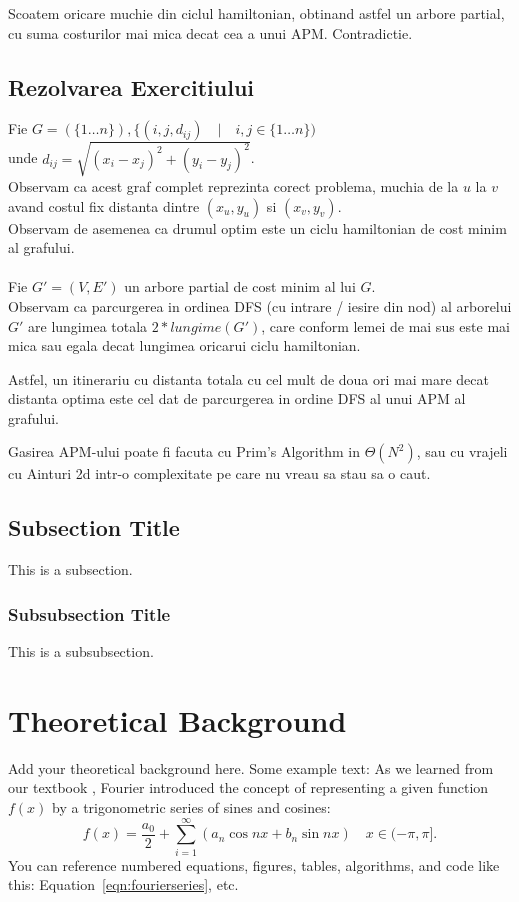\documentclass{article}
\begin{document}
Scoatem oricare muchie din ciclul hamiltonian, obtinand astfel un arbore partial, cu suma costurilor mai mica decat cea a unui APM. Contradictie.

\subsection*{Rezolvarea Exercitiului}

Fie $G = (\{1 \dots n\}), \{(i, j, d_{ij}) \quad | \quad i, j \in \{1 \dots n\})$\\
unde $d_{ij} = \sqrt{(x_i-x_j)^2+(y_i-y_j)^2}$.\\
Observam ca acest graf complet reprezinta corect problema, muchia de la $u$ la $v$ avand costul fix distanta dintre $(x_u, y_u)$ si $(x_v, y_v)$.\\
Observam de asemenea ca drumul optim este un ciclu hamiltonian de cost minim al grafului.\\

\\
Fie $G' = (V, E')$ un arbore partial de cost minim al lui $G$.\\
Observam ca parcurgerea in ordinea DFS (cu intrare / iesire din nod) al arborelui $G'$ are lungimea totala $2 * lungime(G')$, care conform lemei de mai sus este mai mica sau egala decat lungimea oricarui ciclu hamiltonian.

Astfel, un itinerariu cu distanta totala cu cel mult de doua ori mai mare decat distanta optima este cel dat de parcurgerea in ordine DFS al unui APM al grafului.

Gasirea APM-ului poate fi facuta cu Prim's Algorithm in $\Theta(N^2)$, sau cu vrajeli cu Ainturi 2d intr-o complexitate pe care nu vreau sa stau sa o caut.


\subsection{Subsection Title}
This is a subsection.

\subsubsection{Subsubsection Title}
This is a subsubsection.

\section{Theoretical Background}
Add your theoretical background here. Some example text: As we learned from our textbook \cite{kutz_2013}, Fourier introduced the concept of representing a given function $f(x)$ by a trigonometric series of sines and cosines:
\begin{equation}
    f(x) = \frac{a_0}{2} + \sum_{i=1}^\infty \left(a_n\cos{nx} + b_n\sin{nx}\right) \quad x \in (-\pi,\pi].
    \label{eqn:fourierseries}
\end{equation}
You can reference numbered equations, figures, tables, algorithms, and code like this: Equation~\ref{eqn:fourierseries}, etc.
\end{document}
